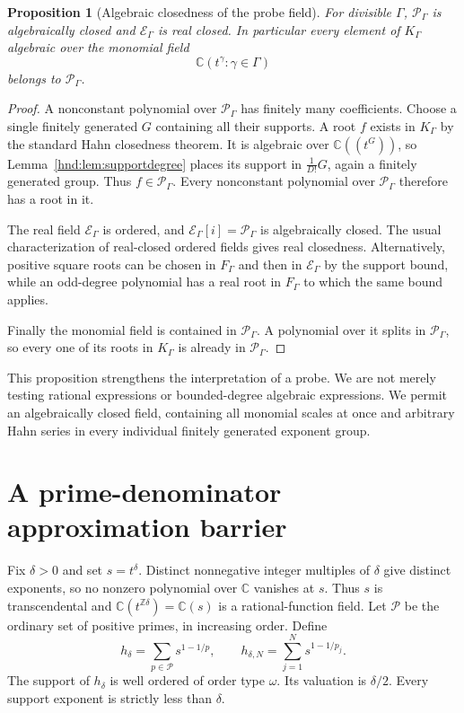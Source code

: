 \documentclass[11pt,oneside]{article}
\newtheorem{proposition}[theorem]{Proposition}
\theoremstyle{definition}
\theoremstyle{remark}
\newcommand{\C}{\mathbb C}
\newcommand{\Z}{\mathbb Z}
\newcommand{\Pfield}{\mathscr P_\Gamma}
\newcommand{\Efield}{\mathscr E_\Gamma}
\newcommand{\primes}{\mathcal P}
\begin{document}
\begin{proposition}[Algebraic closedness of the probe field]
\label{hnd:prop:probeclosed}
For divisible $\Gamma$, $\Pfield$ is algebraically closed and
$\Efield$ is real closed. In particular every element of $K_\Gamma$
algebraic over the monomial field
\[
 \C(t^\gamma:\gamma\in\Gamma)
\]
belongs to $\Pfield$.
\end{proposition}
\begin{proof}
A nonconstant polynomial over $\Pfield$ has finitely many coefficients. Choose a
single finitely generated $G$ containing all their supports. A root $f$
exists in $K_\Gamma$ by the standard Hahn closedness theorem.
It is algebraic over $\C((t^G))$, so
Lemma~\ref{hnd:lem:supportdegree} places its support in
$\frac1{D!}G$, again a finitely generated group. Thus $f\in\Pfield$.
Every nonconstant polynomial over $\Pfield$ therefore has a root in it.

The real field $\Efield$ is ordered, and
$\Efield[i]=\Pfield$ is algebraically closed. The usual
characterization of real-closed ordered fields gives real closedness.
Alternatively, positive square roots can be chosen in $F_\Gamma$ and
then in $\Efield$ by the support bound, while an odd-degree polynomial
has a real root in $F_\Gamma$ to which the same bound applies.

Finally the monomial field is contained in $\Pfield$. A polynomial over
it splits in $\Pfield$, so every one of its roots in $K_\Gamma$ is
already in $\Pfield$.
\end{proof}

This proposition strengthens the interpretation of a probe. We are not
merely testing rational expressions or bounded-degree algebraic
expressions. We permit an algebraically closed field, containing all
monomial scales at once and arbitrary Hahn series in every individual
finitely generated exponent group.

\section{A prime-denominator approximation barrier}\label{hnd:sec:barrier}

Fix $\delta>0$ and set $s=t^\delta$. Distinct nonnegative integer
multiples of $\delta$ give distinct exponents, so no nonzero polynomial
over $\C$ vanishes at $s$. Thus $s$ is transcendental and
$\C(t^{\Z\delta})=\C(s)$ is a rational-function field.
Let $\primes$ be the ordinary set
of positive primes, in increasing order. Define
\begin{equation}\label{hnd:eq:hdefinition}
 h_\delta=\sum_{p\in\primes}s^{1-1/p},\qquad
 h_{\delta,N}=\sum_{j=1}^N s^{1-1/p_j}.
\end{equation}
The support of $h_\delta$ is well ordered of order type $\omega$.
Its valuation is $\delta/2$. Every support exponent is strictly less
than $\delta$.
\end{document}
